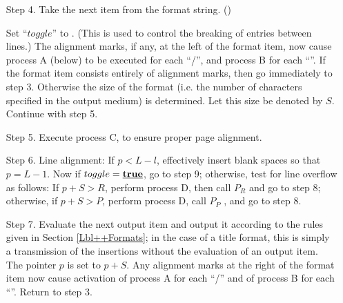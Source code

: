 \documentclass[a4paper,11pt]{article}
\begin{document}
\begin{enumerate}
    \item[Step 4.] Take the next item from the format
      string. ()

      Set ``$toggle$'' to . (This is used to control the
      breaking of entries between lines.) The alignment marks, if any,
      at the left of the format item, now cause process A (below) to
      be executed for each ``/'', and process B for each ``\mpow{}''.
      If the format item consists entirely of alignment marks, then go
      immediately to step 3.  Otherwise the size of the format
      (i.e. the number of characters specified in the output medium)
      is determined.  Let this size be denoted by $S$.  Continue with
      step 5.

    \item[Step 5.] Execute process C, to ensure proper page alignment.

    \item[Step 6.] Line alignment: If $p < L-l$, effectively insert
      blank spaces so that $p = L - 1$.  Now if $toggle =
      {\tt \bf \underline{true}}$, go to step 9; otherwise, test for line overflow as
      follows: If $p + S > R$, perform process D, then call $P_R$ and
      go to step 8; otherwise, if $p + S > P$, perform process D, call
      $P_P$ , and go to step 8.

    \item[Step 7.] Evaluate the next output item and output it
      according to the rules given in Section \ref{Lbl++Formats}; in
      the case of a title format, this is simply a transmission of the
      insertions without the evaluation of an output item.  The
      pointer $p$ is set to $p + S$.  Any alignment marks at the right
      of the format item now cause activation of process A for each
      ``/'' and of process B for each ``\mpow{}''.  Return to step 3.


\end{enumerate}
\end{document}
